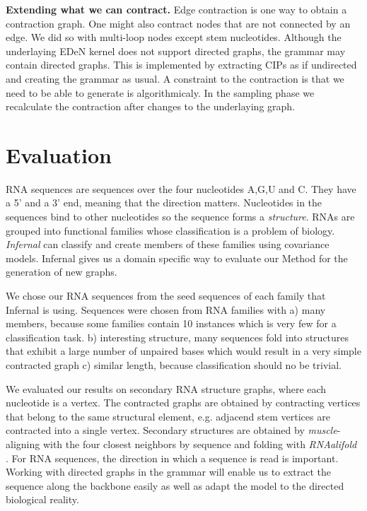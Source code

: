 \documentclass{article}
\begin{document}
\textbf{Extending what we can contract.}
Edge contraction is one way to obtain a contraction graph. 
One might also contract nodes that are not connected by an edge.
We did so with multi-loop nodes except stem nucleotides.
Although the underlaying EDeN kernel does not support directed graphs,
the grammar may contain directed graphs. This is implemented by extracting
CIPs as if undirected and creating the grammar as usual.
A constraint to the contraction is that we need to be able to 
generate is algorithmicaly. In the sampling phase we recalculate 
the contraction after changes to the underlaying graph.


\section{Evaluation}
RNA sequences are sequences over the four nucleotides A,G,U and C.
They have a 5' and a 3' end, meaning that the direction matters.
Nucleotides in the sequences bind to other nucleotides so
the sequence forms a \emph{structure}.
RNAs are grouped into functional families whose classification
is a problem of biology. \emph{Infernal}\cite{infernal} can classify and 
create members of these families using covariance models.
Infernal gives us a domain specific way to evaluate
our Method for the generation of new graphs. 

We chose our RNA sequences from the seed sequences of each family
that Infernal is using\cite{rfam}. Sequences were chosen from RNA families with
a) many members, because some families contain 10
instances which is very few for a classification task. b) interesting 
structure, many sequences fold into structures that exhibit a large number of 
unpaired bases which would result in a very simple contracted graph
c) similar length, because classification should no be trivial.

We evaluated our results on secondary RNA structure graphs, where each 
nucleotide is a vertex. The contracted graphs are obtained by 
contracting vertices that belong to the same structural element,
e.g. adjacend stem vertices are contracted into a single vertex.
Secondary structures are obtained by \emph{muscle}-aligning \cite{muscle} with 
the four closest neighbors by sequence and folding with \emph{RNAalifold}
\cite{rnaalifold}.  For RNA sequences, the direction in which a sequence
is read is important.  Working with directed graphs in the grammar
will enable us to extract the sequence along the backbone easily as well
as adapt the model to the directed biological reality.
\end{document}

